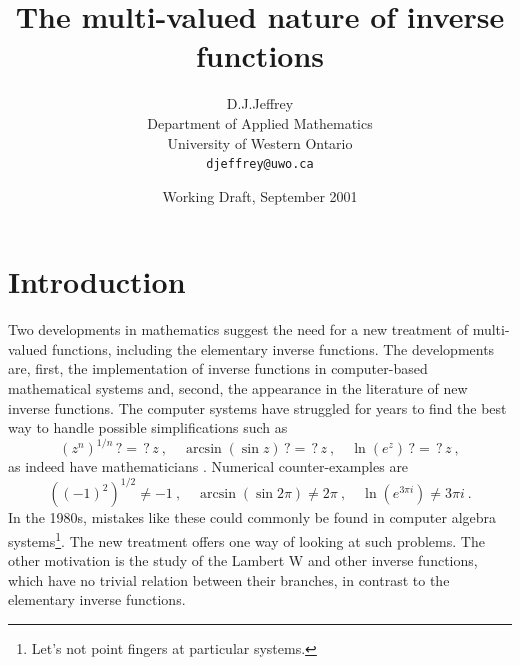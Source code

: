 \documentclass{article}
\begin{document}
\title{The multi-valued nature of inverse functions}
\author{D.J.Jeffrey\\
Department of Applied Mathematics\\
University of Western Ontario\\
\texttt{djeffrey@uwo.ca}}
\date{Working Draft, September 2001}
\maketitle


\section{Introduction}
Two developments in mathematics suggest the need for a new treatment of multi-valued
functions, including the elementary inverse functions.
The developments are, first, the implementation of inverse functions in
computer-based mathematical systems and, second,
the appearance in the literature of new inverse functions.
The computer systems have struggled for years to find the best way to handle
possible simplifications such as
\begin{equation}\label{eq:Opening}
 (z^n)^{1/n}\, ?=\,?\, z\ ,\quad \arcsin(\sin z)\,?=\,?\,z\ , \quad \ln(e^z)\,?=\,?\, z\ ,
\end{equation}
as indeed have mathematicians \cite{Corless:2000:AAS,unwind:1996}.
Numerical counter-examples are
\[ ((-1)^2)^{1/2}\ne -1\ ,\quad \arcsin(\sin 2\pi)\ne 2\pi\ ,
 \quad \ln(e^{3\pi i})\ne 3\pi i\ . \]
In the 1980s, mistakes like these could commonly be found in computer algebra
systems\footnote{Let's not point fingers at particular systems.}.
The new treatment offers one way of looking at such problems.
The other motivation is the study of the Lambert W \cite{LambertW:1996}
and other inverse functions, which have no trivial relation between their branches,
in contrast to the elementary inverse functions.
\end{document}
